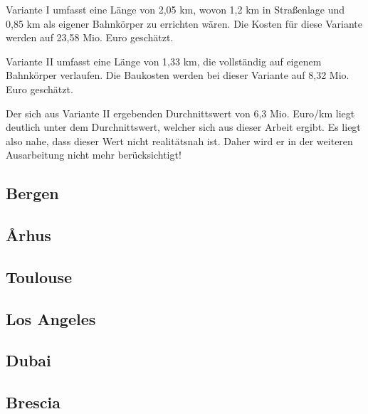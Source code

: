 Variante I umfasst eine Länge von 2,05 km, wovon 1,2 km in Straßenlage und 0,85 km als
eigener Bahnkörper zu errichten wären. Die Kosten für diese Variante werden auf 23,58 Mio.
Euro geschätzt.

Variante II umfasst eine Länge von 1,33 km, die vollständig auf eigenem Bahnkörper verlaufen.
Die Baukosten werden bei dieser Variante auf 8,32 Mio. Euro geschätzt.

Der sich aus Variante II ergebenden Durchnittswert von 6,3 Mio. Euro/km liegt deutlich unter
dem Durchnittswert, welcher sich aus dieser Arbeit ergibt. Es liegt also nahe, dass dieser
Wert nicht realitätsnah ist. Daher wird er in der weiteren Ausarbeitung nicht mehr
berücksichtigt!

\subsection{Bergen}


\subsection{Århus}


\subsection{Toulouse}


\subsection{Los Angeles}


\subsection{Dubai}


\subsection{Brescia}






\begin{landscape}

\end{landscape}

